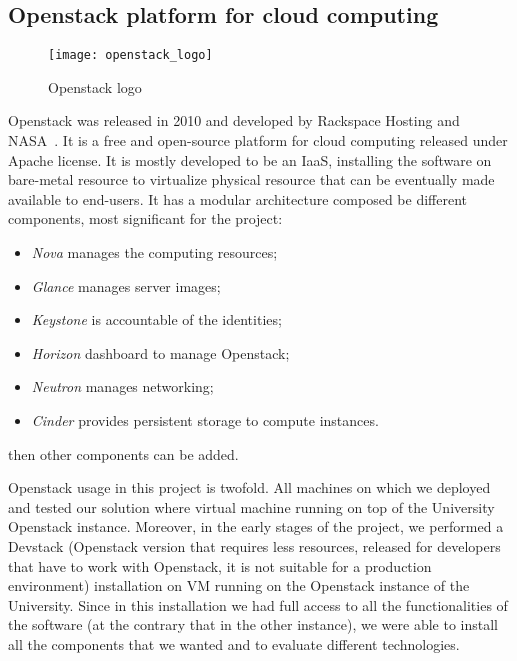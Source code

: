 \subsection{Openstack platform for cloud computing}
\begin{figure}[H]
  \centering \texttt{[image: openstack\_logo]}
  \caption{Openstack logo}
  \label{chap:prjan:img:openstack_logo}
\end{figure}
Openstack was released in 2010 and developed by Rackspace Hosting and
NASA~\cite{openstackWebsite}. It is a free and open-source platform for cloud
computing released under Apache license. It is mostly developed to be an IaaS,
installing the software on bare-metal resource to virtualize physical resource
that can be eventually made available to end-users. It has a modular
architecture composed be different components, most significant for the project:
\begin{itemize}
\item \emph{Nova} manages the computing resources;
\item \emph{Glance} manages server images;
\item \emph{Keystone} is accountable of the identities;
\item \emph{Horizon} dashboard to manage Openstack;
\item \emph{Neutron} manages networking;
\item \emph{Cinder} provides persistent storage to compute instances.
\end{itemize}
then other components can be added.

Openstack usage in this project is twofold. All machines on which we deployed
and tested our solution where virtual machine running on top of the University
Openstack instance. Moreover, in the early stages of the project, we performed
a Devstack (Openstack version that requires less resources, released for
developers that have to work with Openstack, it is not suitable for a production
environment) installation on VM running on the Openstack instance of
the University. Since in this installation we had full access to all the
functionalities of the software (at the contrary that in the other instance), we
were able to install all the components that we wanted and to evaluate different
technologies.


